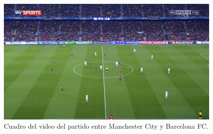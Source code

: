 \begin{appendices}
\begin{figure}[H]
  \centering
  \includegraphics[width=\linewidth]{./images/manchester1.png}
  \caption{Cuadro del video del partido entre Manchester City y Barcelona FC.}
\end{figure}

\end{appendices}
